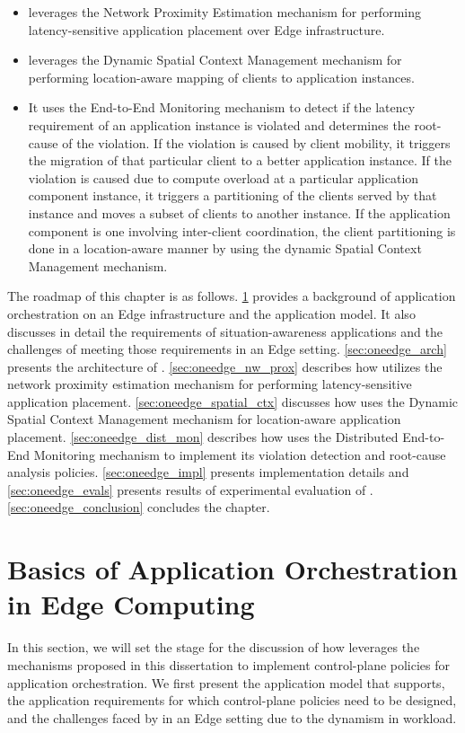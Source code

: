 \begin{itemize}
\item \oneedge{} leverages the Network Proximity Estimation mechanism for performing latency-sensitive application placement over Edge infrastructure. 
\item \oneedge{} leverages the Dynamic Spatial Context Management mechanism for performing location-aware mapping of clients to application instances. 
\item It uses the End-to-End Monitoring mechanism to detect if the latency requirement of an application instance is violated and determines the root-cause of the violation. If the violation is caused by client mobility, it triggers the migration of that particular client to a better application instance. If the violation is caused due to compute overload at a particular application component instance, it triggers a partitioning of the clients served by that instance and moves a subset of clients to another instance. If the application component is one involving inter-client coordination, the client partitioning is done in a location-aware manner by using the dynamic Spatial Context Management mechanism.
\end{itemize}
 The roadmap of this chapter is as follows. \cref{sec:oneedge_background} provides a background of application orchestration on an Edge infrastructure and the application model. It also discusses in detail the requirements of situation-awareness applications and the challenges of meeting those requirements in an Edge setting. \cref{sec:oneedge_arch} presents the architecture of \oneedge{}. \cref{sec:oneedge_nw_prox} describes how \oneedge{} utilizes the network proximity estimation mechanism for performing latency-sensitive application placement. \cref{sec:oneedge_spatial_ctx} discusses how \oneedge{} uses  the Dynamic Spatial Context Management mechanism for location-aware application placement. \cref{sec:oneedge_dist_mon} describes how \oneedge{} uses the Distributed End-to-End Monitoring mechanism to implement its violation detection and root-cause analysis policies. \cref{sec:oneedge_impl} presents implementation details and \cref{sec:oneedge_evals} presents results of experimental evaluation of \oneedge{}. \cref{sec:oneedge_conclusion} concludes the chapter.



\section{Basics of Application Orchestration in Edge Computing}
\label{sec:oneedge_background}
In this section, we will set the stage for the discussion of how \oneedge{} leverages the mechanisms proposed in this dissertation to implement control-plane policies for application orchestration. We first present the application model that \oneedge{} supports, the application requirements for which control-plane policies need to be designed, and the challenges faced by in an Edge setting due to the dynamism in workload.

